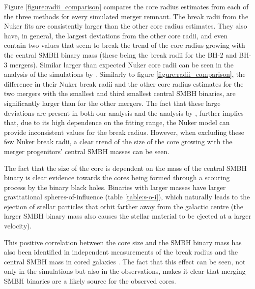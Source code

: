 \documentclass[english, oneside]{HYgradu}
\begin{document}
Figure \ref{figure:radii_comparison} compares the core radius estimates from each of the three methods for every simulated merger remnant. The break radii from the Nuker fits are consistently larger than the other core radius estimates. They also have, in general, the largest deviations from the other core radii, and even contain two values that seem to break the trend of the core radius growing with the central SMBH binary mass (these being the break radii for the BH-2 and BH-3 mergers). Similar larger than expected Nuker core radii can be seen in the analysis of the simulations by \cite{Rantala2018}. Similarly to figure \ref{figure:radii_comparison}, the difference in their Nuker break radii and the other core radius estimates for the two mergers with the smallest and third smallest central SMBH binaries, are significantly larger than for the other mergers. The fact that these large deviations are present in both our analysis and the analysis by \cite{Rantala2018}, further implies that, due to its high dependence on the fitting range, the Nuker model can provide inconsistent values for the break radius. However, when excluding these few Nuker break radii, a clear trend of the size of the core growing with the merger progenitors' central SMBH masses can be seen.

The fact that the size of the core is dependent on the mass of the central SMBH binary is clear evidence towards the cores being formed through a scouring process by the binary black holes. Binaries with larger masses have larger gravitational spheres-of-influence (table \ref{table:s-o-i}), which naturally leads to the ejection of stellar particles that orbit farther away from the galactic centre (the larger SMBH binary mass also causes the stellar material to be ejected at a larger velocity). 

This positive correlation between the core size and the SMBH binary mass has also been identified in independent measurements of the break radius and the central SMBH mass in cored galaxies \citep[e.g.][]{deRuiter2005, Lauer2007Cusp, Thomas2016}. The fact that this effect can be seen, not only in the simulations but also in the observations, makes it clear that merging SMBH binaries are a likely source for the observed cores.
\end{document}
